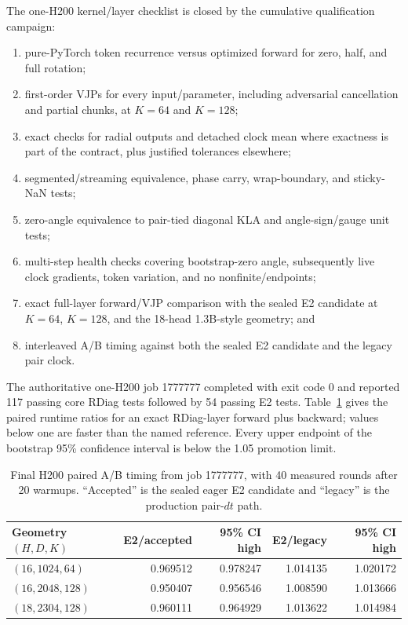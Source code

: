 \documentclass[11pt]{article}
\begin{document}
The one-H200 kernel/layer checklist is closed by the cumulative qualification campaign:
\begin{enumerate}[leftmargin=1.8em]
  \item pure-PyTorch token recurrence versus optimized forward for zero, half, and full rotation;
  \item first-order VJPs for every input/parameter, including adversarial cancellation and partial
        chunks, at $K=64$ and $K=128$;
  \item exact checks for radial outputs and detached clock mean where exactness is part of the
        contract, plus justified tolerances elsewhere;
  \item segmented/streaming equivalence, phase carry, wrap-boundary, and sticky-NaN tests;
  \item zero-angle equivalence to pair-tied diagonal KLA and angle-sign/gauge unit tests;
  \item multi-step health checks covering bootstrap-zero angle, subsequently live clock gradients,
        token variation, and no nonfinite/endpoints;
  \item exact full-layer forward/VJP comparison with the sealed E2 candidate at $K=64$, $K=128$,
        and the 18-head 1.3B-style geometry; and
  \item interleaved A/B timing against both the sealed E2 candidate and the legacy pair clock.
\end{enumerate}

The authoritative one-H200 job 1777777 completed with exit code 0 and reported 117 passing core
RDiag tests followed by 54 passing E2 tests.  Table~\ref{tab:final-perf} gives the paired runtime
ratios for an exact RDiag-layer forward plus backward; values below one are faster than the named
reference.  Every upper endpoint of the bootstrap 95\% confidence interval is below the 1.05
promotion limit.

\begin{table}[ht]
  \centering
  \small
  \caption{Final H200 paired A/B timing from job 1777777, with 40 measured rounds after 20 warmups.
  ``Accepted'' is the sealed eager E2 candidate and ``legacy'' is the production pair-$dt$ path.}
  \label{tab:final-perf}
  \begin{tabular}{@{}lrrrr@{}}
    \toprule
    Geometry $(H,D,K)$ & E2/accepted & 95\% CI high & E2/legacy & 95\% CI high \\
    \midrule
    $(16,1024,64)$   & 0.969512 & 0.978247 & 1.014135 & 1.020172 \\
    $(16,2048,128)$  & 0.950407 & 0.956546 & 1.008590 & 1.013666 \\
    $(18,2304,128)$  & 0.960111 & 0.964929 & 1.013622 & 1.014984 \\
    \bottomrule
  \end{tabular}
\end{table}
\end{document}
